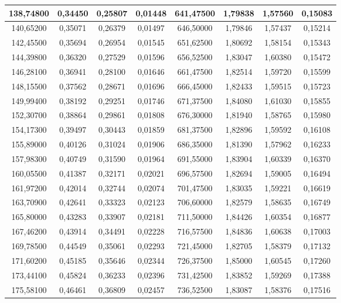 \documentclass[a4paper,12pt]{article}
\numberwithin{equation}{section}
\begin{document}
\begin{appendices}
\begin{longtable}[c]{|c|c|c|c|c|c|c|c|}
138,74800	&	0,34450	&	0,25807	&	0,01448	&	641,47500	&	1,79838	&	1,57560	&	0,15083	\\\hline
140,65200	&	0,35071	&	0,26379	&	0,01497	&	646,50000	&	1,79846	&	1,57437	&	0,15214	\\\hline
142,45500	&	0,35694	&	0,26954	&	0,01545	&	651,62500	&	1,80692	&	1,58154	&	0,15343	\\\hline
144,39800	&	0,36320	&	0,27529	&	0,01596	&	656,52500	&	1,83047	&	1,60380	&	0,15472	\\\hline
146,28100	&	0,36941	&	0,28100	&	0,01646	&	661,47500	&	1,82514	&	1,59720	&	0,15599	\\\hline
148,15500	&	0,37562	&	0,28671	&	0,01696	&	666,45000	&	1,82433	&	1,59515	&	0,15723	\\\hline
149,99400	&	0,38192	&	0,29251	&	0,01746	&	671,37500	&	1,84080	&	1,61030	&	0,15855	\\\hline
152,30700	&	0,38864	&	0,29861	&	0,01808	&	676,30000	&	1,81940	&	1,58765	&	0,15980	\\\hline
154,17300	&	0,39497	&	0,30443	&	0,01859	&	681,37500	&	1,82896	&	1,59592	&	0,16108	\\\hline
155,89000	&	0,40126	&	0,31024	&	0,01906	&	686,35000	&	1,81390	&	1,57962	&	0,16233	\\\hline
157,98300	&	0,40749	&	0,31590	&	0,01964	&	691,55000	&	1,83904	&	1,60339	&	0,16370	\\\hline
160,05500	&	0,41387	&	0,32171	&	0,02021	&	696,57500	&	1,82694	&	1,59005	&	0,16494	\\\hline
161,97200	&	0,42014	&	0,32744	&	0,02074	&	701,47500	&	1,83035	&	1,59221	&	0,16619	\\\hline
163,70900	&	0,42641	&	0,33323	&	0,02123	&	706,60000	&	1,82579	&	1,58635	&	0,16749	\\\hline
165,80000	&	0,43283	&	0,33907	&	0,02181	&	711,50000	&	1,84426	&	1,60354	&	0,16877	\\\hline
167,46200	&	0,43914	&	0,34491	&	0,02228	&	716,57500	&	1,84836	&	1,60638	&	0,17003	\\\hline
169,78500	&	0,44549	&	0,35061	&	0,02293	&	721,45000	&	1,82705	&	1,58379	&	0,17132	\\\hline
171,60200	&	0,45185	&	0,35646	&	0,02344	&	726,37500	&	1,85000	&	1,60545	&	0,17260	\\\hline
173,44100	&	0,45824	&	0,36233	&	0,02396	&	731,42500	&	1,83852	&	1,59269	&	0,17388	\\\hline
175,58100	&	0,46461	&	0,36809	&	0,02457	&	736,52500	&	1,83087	&	1,58376	&	0,17516	\\\hline

\end{longtable}
\end{appendices}
\end{document}
